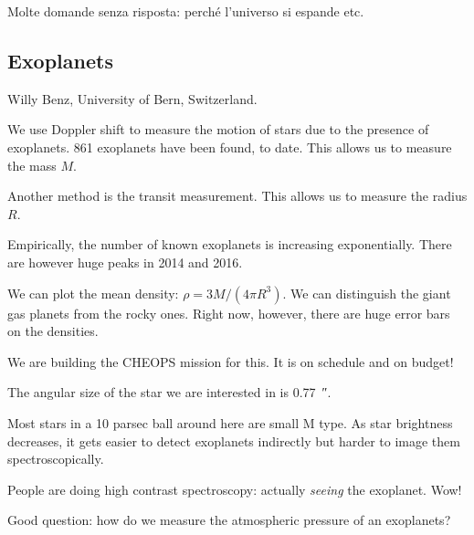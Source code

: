 \documentclass[main.tex]{subfiles}
\begin{document}
Molte domande senza risposta: perché l'universo si espande etc. 

\subsection{Exoplanets}

Willy Benz, University of Bern, Switzerland.

We use Doppler shift to measure the motion of stars due to the presence of exoplanets. 861 exoplanets have been found, to date. This allows us to measure the mass \(M\).

Another method is the transit measurement. This allows us to measure the radius \(R\).

Empirically, the number of known exoplanets is increasing exponentially. There are however huge peaks in 2014 and 2016. 


We can plot the mean density: \(\rho = 3 M / (4 \pi R^3 )\). We can distinguish the giant gas planets from the rocky ones.
Right now, however, there are huge error bars on the densities.

We are building the CHEOPS mission for this. It is on schedule and on budget! 

The angular size of the star we are interested in is \SI{0.77}{\arcsecond}.

Most stars in a 10 parsec ball around here are small M type. As star brightness decreases, it gets easier to detect exoplanets indirectly but harder to image them spectroscopically.

People are doing high contrast spectroscopy: actually \emph{seeing} the exoplanet. Wow!

Good question: how do we measure the atmospheric pressure of an exoplanets?
\end{document}
